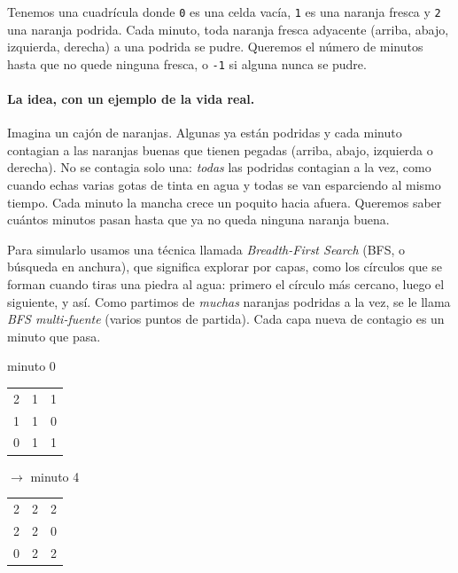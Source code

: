 
Tenemos una cuadrícula donde \texttt{0} es una celda vacía, \texttt{1} es una
naranja fresca y \texttt{2} una naranja podrida. Cada minuto, toda naranja
fresca adyacente (arriba, abajo, izquierda, derecha) a una podrida se pudre.
Queremos el número de minutos hasta que no quede ninguna fresca, o
\texttt{-1} si alguna nunca se pudre.

\paragraph{La idea, con un ejemplo de la vida real.} Imagina un cajón de
naranjas. Algunas ya están podridas y cada minuto contagian a las naranjas
buenas que tienen pegadas (arriba, abajo, izquierda o derecha). No se contagia
solo una: \emph{todas} las podridas contagian a la vez, como cuando echas
varias gotas de tinta en agua y todas se van esparciendo al mismo tiempo. Cada
minuto la mancha crece un poquito hacia afuera. Queremos saber cuántos minutos
pasan hasta que ya no queda ninguna naranja buena.

Para simularlo usamos una técnica llamada \emph{Breadth-First Search} (BFS, o
búsqueda en anchura), que significa explorar por capas, como los círculos que
se forman cuando tiras una
piedra al agua: primero el círculo más cercano, luego el siguiente, y así. Como
partimos de \emph{muchas} naranjas podridas a la vez, se le llama \emph{BFS
multi-fuente} (varios puntos de partida). Cada capa nueva de contagio es un
minuto que pasa.

\begin{center}
\ttfamily
minuto 0\quad
\begin{tabular}{ccc}2&1&1\\1&1&0\\0&1&1\end{tabular}
\;$\rightarrow$\;
minuto 4\quad
\begin{tabular}{ccc}2&2&2\\2&2&0\\0&2&2\end{tabular}
\end{center}

